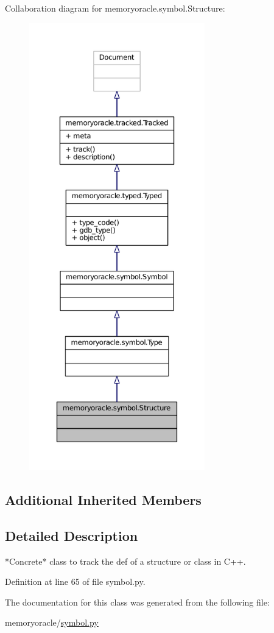 Collaboration diagram for memoryoracle.\+symbol.\+Structure\+:
\nopagebreak
\begin{figure}[H]
\begin{center}
\leavevmode
\includegraphics[height=550pt]{classmemoryoracle_1_1symbol_1_1Structure__coll__graph}
\end{center}
\end{figure}
\subsection*{Additional Inherited Members}


\subsection{Detailed Description}
\begin{DoxyVerb}*Concrete* class to track the def of a structure or class in C++.
\end{DoxyVerb}
 

Definition at line 65 of file symbol.\+py.



The documentation for this class was generated from the following file\+:\begin{DoxyCompactItemize}
\item 
memoryoracle/\hyperlink{symbol_8py}{symbol.\+py}\end{DoxyCompactItemize}
